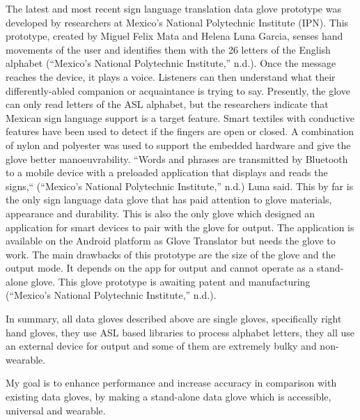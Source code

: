 The latest and most recent sign language translation data glove prototype was developed by researchers at Mexico's National Polytechnic Institute (IPN). This prototype, created by Miguel Felix Mata and Helena Luna Garcia, senses hand movements of the user and identifies them with the 26 letters of the English alphabet (``Mexico’s National Polytechnic Institute,'' n.d.). Once the message reaches the device, it plays a voice. Listeners can then understand what their differently-abled companion or acquaintance is trying to say. Presently, the glove can only read letters of the ASL alphabet, but the researchers indicate that Mexican sign language support is a target feature. Smart textiles with conductive features have been used to detect if the fingers are open or closed. A combination of nylon and polyester was used to support the embedded hardware and give the glove better manoeuvrability. ``Words and phrases are transmitted by Bluetooth to a mobile device with a preloaded application that displays and reads the signs,`` (``Mexico’s National Polytechnic Institute,'' n.d.) Luna said. This by far is the only sign language data glove that has paid attention to glove materials, appearance and durability. This is also the only glove which designed an application for smart devices to pair with the glove for output. The application is available on the Android platform as Glove Translator but needs the glove to work. The main drawbacks of this prototype are the size of the glove and the output mode. It depends on the app for output and cannot operate as a stand-alone glove. This glove prototype is awaiting patent and manufacturing (``Mexico’s National Polytechnic Institute,'' n.d.).

In summary, all data gloves described above are single gloves, specifically right hand gloves, they use ASL based libraries to process alphabet letters, they all use an external device for output and some of them are extremely bulky and non-wearable. 


My goal is to enhance performance and increase accuracy in comparison with existing data gloves, by making a stand-alone data glove which is accessible, universal and wearable. 

